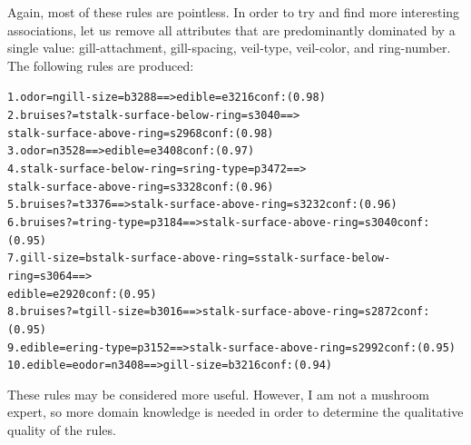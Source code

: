 \documentclass[margin,letterpaper,11pt]{scrartcl}
\begin{document}
Again, most of these rules are pointless. In order to try and find more
interesting associations, let us remove all attributes that are predominantly
dominated by a single value: gill-attachment, gill-spacing, veil-type,
veil-color, and ring-number. The following rules are produced:
\begin{alltt}
 1. odor=n gill-size=b 3288 ==> edible=e 3216    conf:(0.98)
 2. bruises?=t stalk-surface-below-ring=s 3040 ==>
      stalk-surface-above-ring=s 2968 conf:(0.98)
 3. odor=n 3528 ==> edible=e 3408    conf:(0.97)
 4. stalk-surface-below-ring=s ring-type=p 3472 ==>
      stalk-surface-above-ring=s 3328 conf:(0.96)
 5. bruises?=t 3376 ==> stalk-surface-above-ring=s 3232    conf:(0.96)
 6. bruises?=t ring-type=p 3184 ==> stalk-surface-above-ring=s 3040    conf:(0.95)
 7. gill-size=b stalk-surface-above-ring=s stalk-surface-below-ring=s 3064 ==> 
      edible=e 2920    conf:(0.95)
 8. bruises?=t gill-size=b 3016 ==> stalk-surface-above-ring=s 2872    conf:(0.95)
 9. edible=e ring-type=p 3152 ==> stalk-surface-above-ring=s 2992    conf:(0.95)
10. edible=e odor=n 3408 ==> gill-size=b 3216    conf:(0.94)
\end{alltt}

These rules may be considered more useful. However, I am not a mushroom expert,
so more domain knowledge is needed in order to determine the qualitative
quality of the rules.
\end{document}
